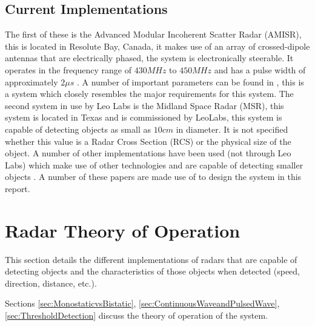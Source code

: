 \documentclass[11pt]{witseiepaper}
\begin{document}

\subsection{Current Implementations} \label{sec:CurrentImplementations}
 The first of these is the Advanced Modular Incoherent Scatter Radar (AMISR), this is located in Resolute Bay, Canada, it makes use of an array of crossed-dipole antennas that are electrically phased, the system is electronically steerable. It operates in the frequency range of $430 MHz$ to $450 MHz$ and has a pulse width of approximately $2 \mu s$ \cite{AMISR}. A number of important parameters can be found in \cite{AMISR}, this is a system which closely resembles the major requirements for this system.
The second system in use by Leo Labs is the Midland Space Radar (MSR), this system is located in Texas and is commissioned by LeoLabs, this system is capable of detecting objects as small as $10 cm$ in diameter. It is not specified whether this value is a Radar Cross Section  (RCS) or the physical size of the object.
A number of other implementations have been used (not through Leo Labs) which make use of other technologies and are capable of detecting smaller objects \cite{EISCAT, SIMO, telescope, BeamForming, OrbitDetermination, PlanarArray}. A number of these papers are made use of to design the system in this report.




\section{Radar Theory of Operation} \label{sec:RadarTheoryOfOperation}
This section details the different implementations of radars that are capable of detecting objects and the characteristics of those objects when detected (speed, direction, distance, etc.).

Sections \ref{sec:MonostaticvsBistatic}, \ref{sec:ContinuousWaveandPulsedWave}, \ref{sec:ThresholdDetection} discuss the theory of operation of the system.
\end{document}
